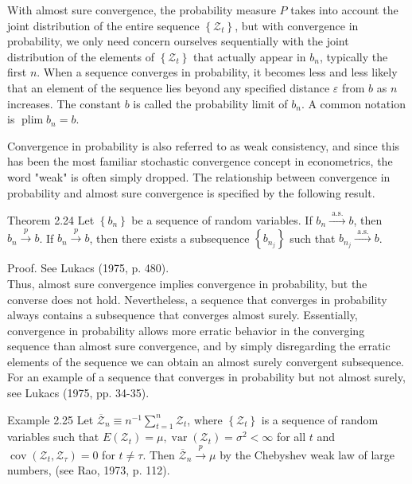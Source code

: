 \documentclass[10pt]{article}
\begin{document}
With almost sure convergence, the probability measure $P$ takes into account the joint distribution of the entire sequence $\left\{\mathcal{Z}_{t}\right\}$, but with convergence in probability, we only need concern ourselves sequentially with the joint distribution of the elements of $\left\{\mathcal{Z}_{t}\right\}$ that actually appear in $b_{n}$, typically the first $n$. When a sequence converges in probability, it becomes less and less likely that an element of the sequence lies beyond any specified distance $\varepsilon$ from $b$ as $n$ increases. The constant $b$ is called the probability limit of $b_{n}$. A common notation is $\operatorname{plim} b_{n}=b$.

Convergence in probability is also referred to as weak consistency, and since this has been the most familiar stochastic convergence concept in econometrics, the word "weak" is often simply dropped. The relationship between convergence in probability and almost sure convergence is specified by the following result.

Theorem 2.24 Let $\left\{b_{n}\right\}$ be a sequence of random variables. If $b_{n} \xrightarrow{\text { a.s. }} b$, then $b_{n} \xrightarrow{p} b$. If $b_{n} \xrightarrow{p} b$, then there exists a subsequence $\left\{b_{n_{j}}\right\}$ such that $b_{n_{j}} \xrightarrow{\text { a.s. }} b$.

Proof. See Lukacs (1975, p. 480).\\
Thus, almost sure convergence implies convergence in probability, but the converse does not hold. Nevertheless, a sequence that converges in probability always contains a subsequence that converges almost surely. Essentially,\\
convergence in probability allows more erratic behavior in the converging sequence than almost sure convergence, and by simply disregarding the erratic elements of the sequence we can obtain an almost surely convergent subsequence. For an example of a sequence that converges in probability but not almost surely, see Lukacs (1975, pp. 34-35).

Example 2.25 Let $\overline{\mathcal{Z}}_{n} \equiv n^{-1} \sum_{t=1}^{n} \mathcal{Z}_{t}$, where $\left\{\mathcal{Z}_{t}\right\}$ is a sequence of random variables such that $E\left(\mathcal{Z}_{t}\right)=\mu, \operatorname{var}\left(\mathcal{Z}_{t}\right)=\sigma^{2}<\infty$ for all $t$ and $\operatorname{cov}\left(\mathcal{Z}_{t}, \mathcal{Z}_{\tau}\right)=0$ for $t \neq \tau$. Then $\overline{\mathcal{Z}}_{n} \xrightarrow{p} \mu$ by the Chebyshev weak law of large numbers, (see Rao, 1973, p. 112).
\end{document}
